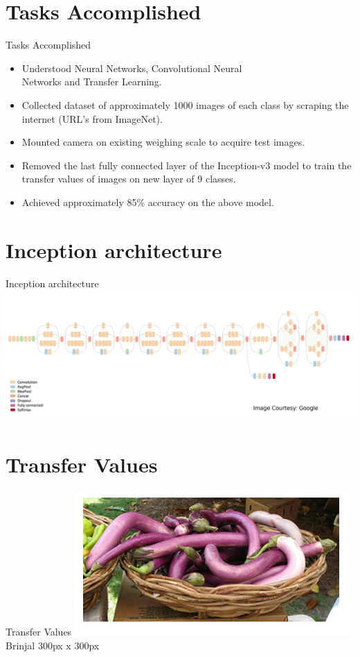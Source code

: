 \documentclass[10pt, a4paper,xcolor=table]{beamer}
\begin{document}
\section{Tasks Accomplished}
\begin{frame}{Tasks Accomplished}
		\begin{itemize}
			\item Understood Neural Networks, Convolutional Neural \\ Networks and Transfer Learning.
			\item Collected dataset of approximately 1000 images of each class by scraping the internet (URL's from ImageNet).
			\item Mounted camera on existing weighing scale to acquire test images. 
			\item Removed the last fully connected layer of the Inception-v3 model to train the transfer values of images on new layer of 9 classes.
			\item Achieved approximately 85\% accuracy on the above model.
		\end{itemize}
\end{frame}

\section{Inception architecture}
\begin{frame}{Inception architecture}
	\includegraphics[scale=0.192]{inceptionrenamed.png}
\end{frame}

\section{Transfer Values}
\begin{frame}{Transfer Values}
	\includegraphics[scale=0.7]{brinjal1.png} \\
	\centering
	Brinjal 300px x 300px
\end{frame}
\end{document}
